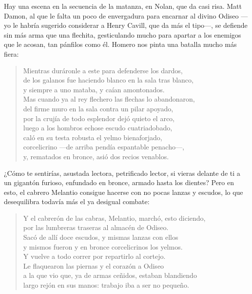 Hay una escena en la secuencia de la matanza, en Nolan, que da casi risa. Matt Damon, al que le falta un poco de envergadura para encarnar al divino Odiseo ---yo le habría sugerido considerar a Henry Cavill, que da más el tipo---, se defiende sin más arma que una flechita, gesticulando mucho para apartar a los enemigos que le acosan, tan pánfilos como él. Homero nos pinta una batalla mucho más fiera:

\begin{verse}
Mientras duráronle a este para defenderse los dardos,\\
de los galanos fue haciendo blanco en la sala tras blanco,\\
y siempre a uno mataba, y caían amontonados.\\
Mas cuando ya al rey flechero las flechas lo abandonaron,\\
del firme muro en la sala contra un pilar apoyado,\\
por la crujía de todo esplendor dejó quieto el arco,\\
luego a los hombros echose escudo cuatriadobado,\\
caló en su testa robusta el yelmo bienaforjado,\\
corcelicrino ---de arriba pendía espantable penacho---,\\
y, rematados en bronce, asió dos recios venablos.
\end{verse}

¿Cómo te sentirías, asustada lectora, petrificado lector, si vieras delante de ti a un gigantón furioso, enfundado en bronce, armado hasta los dientes? Pero en esto, el cabrero Melantio consigue hacerse con no pocas lanzas y escudos, lo que desequilibra todavía más el ya desigual combate:

\begin{verse}
Y el cabrerón de las cabras, Melantio, marchó, esto diciendo,\\
por las lumbreras traseras al almacén de Odiseo.\\
Sacó de allí doce escudos, y mismas lanzas con ellos\\
y mismos fueron y en bronce corcelicrinos los yelmos.\\
Y vuelve a todo correr por repartirlo al cortejo.\\
Le flaquearon las piernas y el corazón a Odiseo\\
a la que vio que, ya de armas ceñidos, estaban blandiendo\\
largo rejón en sus manos: trabajo iba a ser no pequeño.
\end{verse}


